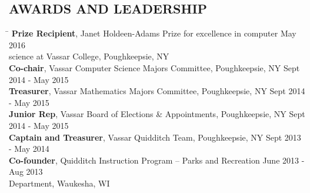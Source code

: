 \documentclass{res}
\begin{document}
\begin{resume}
{  \vspace{-16pt}
  \section{\hspace{0.2in}AWARDS AND LEADERSHIP}
    \vspace{-3pt}
    \begin{tabbing}
      \hspace{5.65in}\=  \kill %
      {\bf Prize Recipient}, Janet Holdeen-Adams Prize for excellence in
          computer\> May 2016\\
          \hspace{90pt} science at Vassar College, Poughkeepsie, NY\\
      {\bf Co-chair}, Vassar Computer Science Majors
          Committee, Poughkeepsie, NY\> Sept 2014 - May 2015\\
      {\bf Treasurer}, Vassar Mathematics Majors Committee, Poughkeepsie, NY\>
          Sept 2014 - May 2015\\
      {\bf Junior Rep}, Vassar Board of Elections \&
          Appointments, Poughkeepsie, NY\> Sept 2014 - May 2015\\
      {\bf Captain and Treasurer}, Vassar Quidditch Team, Poughkeepsie, NY\>
          Sept 2013 - May 2014\\
      {\bf Co-founder}, Quidditch Instruction Program -- Parks and Recreation\>
           June 2013 - Aug 2013\\
          \hspace{68pt} Department, Waukesha, WI\\
    \end{tabbing}
} %
\end{resume}
\end{document}
